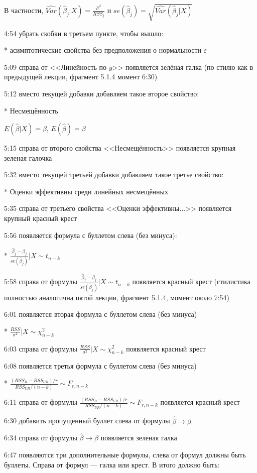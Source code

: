 \documentclass[12pt,a4paper]{article}
\newcommand{\e}{\varepsilon}
\renewcommand{\b}{\beta}
\newcommand{\hb}{\hat{\b}}
\begin{document}
В частности, $\widehat{Var}(\hat{\beta}_j|X)=\frac{\hat{\sigma}^2}{RSS_j}$
и $se(\hat{\beta}_j)=\sqrt{\widehat{Var}(\hat{\beta}_j|X)}$

4:54 убрать скобки в третьем пункте, чтобы вышло:

* асимптотические свойства без предположения о нормальности  $\e$

5:09 справа от <<Линейность по $y$>>  появляется зелёная галка (по стилю как в предыдущей лекции, фрагмент 5.1.4 момент 6:30)

5:12 вместо текущей добавки добавляем такое второе свойство:

* Несмещённость

$E(\hb|X)=\beta$, $E(\hb)=\beta$

5:15 справа от второго свойства <<Несмещённость>> появляется крупная зеленая галочка

5:32 вместо текущей третьей добавки добавляем такое третье свойство:

* Оценки эффективны среди линейных несмещённых

5:35 справа от третьего свойства <<Оценки эффективны...>> появляется крупный красный крест

5:56 появляется формула с буллетом слева (без минуса):

* $\frac{\hat{\beta}_j-\beta_j}{se(\hat{\beta}_j)} | X \sim t_{n-k}$

5:58 справа от формулы $\frac{\hat{\beta}_j-\beta_j}{se(\hat{\beta}_j)} | X \sim t_{n-k}$ появляется красный крест (стилистика полностью аналогична пятой лекции, фрагмент 5.1.4, момент около 7:54)

6:01 появляется вторая формула с буллетом слева (без минуса)

* $\frac{RSS}{\sigma^2} |X \sim \chi^2_{n-k}$ 

6:03 справа от формулы $\frac{RSS}{\sigma^2} |X \sim \chi^2_{n-k}$  появляется красный крест

6:08 появляется третья формула с буллетом слева (без минуса)

* $\frac{(RSS_R-RSS_{UR})/r}{RSS_{UR}/(n-k)} \sim F_{r,n-k}$

6:11 справа от формулы  $\frac{(RSS_R-RSS_{UR})/r}{RSS_{UR}/(n-k)} \sim F_{r,n-k}$  появляется красный крест

6:30 добавить пропущенный буллет слева от формулы $\hb \to \beta$

6:34 справа от формулы $\hb \to \beta$ появляется зеленая галка

6:47 появляются три дополнительные формулы, слева от формул должны быть буллеты. Справа от формул --- галка или крест. В итого должно быть:
\end{document}
